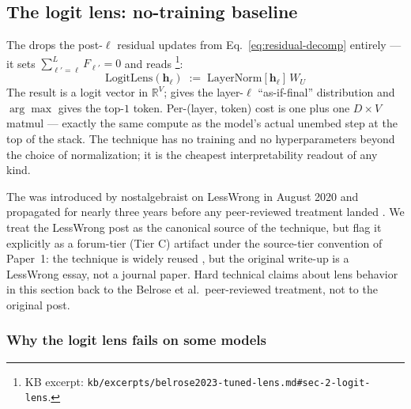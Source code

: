 \subsection{The logit lens: no-training baseline}
\label{sec:logit-lens}

The  drops the post-$\ell$ residual updates from
Eq.~\eqref{eq:residual-decomp} entirely — it sets
$\sum_{\ell'=\ell}^{L} F_{\ell'} = 0$ and reads
\citep[\S 2, Eq.~3]{belrose2023-tuned-lens}\footnote{KB excerpt:
\texttt{kb/excerpts/belrose2023-tuned-lens.md\#sec-2-logit-lens}.}:
\begin{equation}
  \boxed{\;\mathrm{LogitLens}(\mathbf{h}_\ell) \;:=\; \mathrm{LayerNorm}[\mathbf{h}_\ell]\,W_U\;}
  \label{eq:logit-lens}
\end{equation}
The result is a logit vector in $\mathbb{R}^V$;  gives the
layer-$\ell$ ``as-if-final'' distribution and $\arg\max$ gives the
top-$1$ token. Per-(layer, token) cost is one  plus one
$D \times V$ matmul — exactly the same compute as the model's actual
unembed step at the top of the stack. The technique has no training
 and no hyperparameters beyond the choice of normalization;
it is the cheapest interpretability readout of any kind.

\begin{forumsignal}
The  was introduced by nostalgebraist on LessWrong in August
2020 \citep{nostalgebraist2020-logit-lens} and propagated for nearly
three years before any peer-reviewed treatment landed
\citep[\S 2]{belrose2023-tuned-lens}. We treat the LessWrong post as the
canonical source of the technique, but flag it explicitly as a
forum-tier (Tier C) artifact under the source-tier convention of
Paper~1: the technique is widely reused
\citep[Halawi 2023, Geva 2022, Dar 2022 referenced in
][\S 2]{belrose2023-tuned-lens}, but the original write-up is a
LessWrong essay, not a journal paper. Hard technical claims about lens
behavior in this section back to the Belrose et al.\ peer-reviewed
treatment, not to the original post.
\end{forumsignal}

\subsubsection*{Why the logit lens fails on some models}

